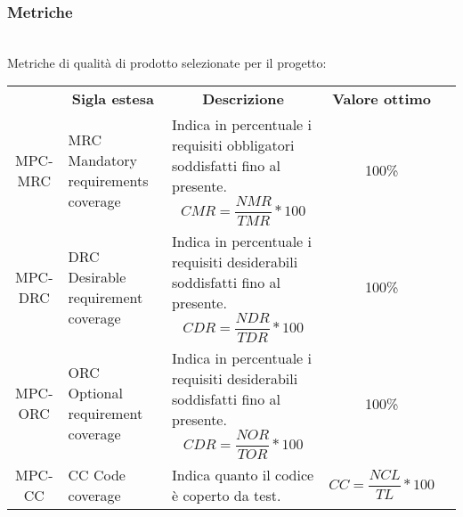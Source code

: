 \subsubsection{Metriche}\mbox{}\\
Metriche di qualità di prodotto selezionate per il progetto:
\begin{table}[H]
    \centering
    \renewcommand{\arraystretch}{1.8}
    \begin{tabular}{| c | p{4.2cm} | p{5cm} |c |  c  }
        \rowcolor[HTML]{a52a2a}
        \multicolumn{1}{c}{\color[HTML]{FFFFFF} \textbf{Codice}}       &
        \multicolumn{1}{c}{\color[HTML]{FFFFFF} \textbf{Sigla estesa}} &
        \multicolumn{1}{c}{\color[HTML]{FFFFFF} \textbf{Descrizione}}  &
        \multicolumn{1}{c}{\color[HTML]{FFFFFF} \textbf{Valore ottimo}}                                                                                                                                                                                                                                      \\
        MPC-MRC                                                        & MRC Mandatory requirements coverage & Indica in percentuale i requisiti obbligatori soddisfatti fino al presente. \begin{equation} CMR=\frac{NMR}{TMR}*100 \end{equation} & 100\%                                                   \\
        MPC-DRC                                                        & DRC Desirable requirement coverage  & Indica in percentuale i requisiti desiderabili soddisfatti fino al presente.\begin{equation} CDR=\frac{NDR}{TDR}*100 \end{equation} & 100\%                                                   \\
        MPC-ORC                                                        & ORC Optional requirement coverage   & Indica in percentuale i requisiti desiderabili soddisfatti fino al presente.\begin{equation} CDR=\frac{NOR}{TOR}*100 \end{equation} & 100\%                                                   \\
        MPC-CC                                                         & CC Code coverage                    & Indica quanto il codice è coperto da test.                                                                                          & \begin{equation}CC = \frac{NCL}{TL} * 100\end{equation} \\

        \hline
    \end{tabular}
\end{table}